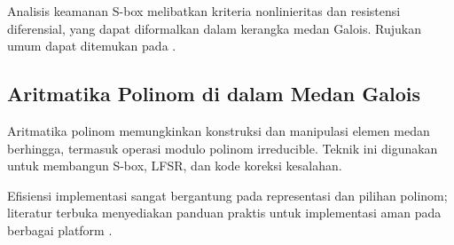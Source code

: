 \documentclass[../main.tex]{subfiles}
\begin{document}
Analisis keamanan S-box melibatkan kriteria nonlinieritas dan resistensi diferensial, yang dapat diformalkan dalam kerangka medan Galois. Rujukan umum dapat ditemukan pada \textcite{menezes1996handbook}.

\subsection{Aritmatika Polinom di dalam Medan Galois}
Aritmatika polinom memungkinkan konstruksi dan manipulasi elemen medan berhingga, termasuk operasi modulo polinom irreducible. Teknik ini digunakan untuk membangun S-box, LFSR, dan kode koreksi kesalahan.

Efisiensi implementasi sangat bergantung pada representasi dan pilihan polinom; literatur terbuka menyediakan panduan praktis untuk implementasi aman pada berbagai platform \parencite{menezes1996handbook}.
\end{document}
